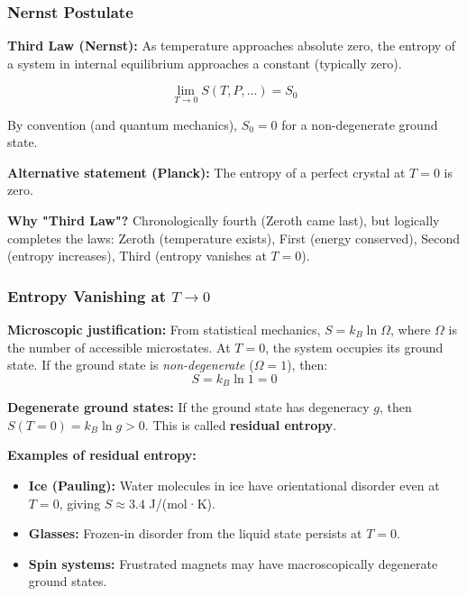 \documentclass[9pt,twocoloumn]{article}
\begin{document}
\subsubsection{Nernst Postulate}

\textbf{Third Law (Nernst):} As temperature approaches absolute zero, the entropy of a system in internal equilibrium approaches a constant (typically zero).

\begin{equation}
\boxed{\lim_{T \to 0} S(T, P, \ldots) = S_0}
\end{equation}

By convention (and quantum mechanics), $S_0 = 0$ for a non-degenerate ground state.

\textbf{Alternative statement (Planck):} The entropy of a perfect crystal at $T = 0$ is zero.

\textbf{Why "Third Law"?} Chronologically fourth (Zeroth came last), but logically completes the laws: Zeroth (temperature exists), First (energy conserved), Second (entropy increases), Third (entropy vanishes at $T = 0$).

\subsubsection{Entropy Vanishing at $T \to 0$}

\textbf{Microscopic justification:} From statistical mechanics, $S = k_B \ln \Omega$, where $\Omega$ is the number of accessible microstates. At $T = 0$, the system occupies its ground state. If the ground state is \emph{non-degenerate} ($\Omega = 1$), then:
\begin{equation}
S = k_B \ln 1 = 0
\end{equation}

\textbf{Degenerate ground states:} If the ground state has degeneracy $g$, then $S(T=0) = k_B \ln g > 0$. This is called \textbf{residual entropy}.

\textbf{Examples of residual entropy:}
\begin{itemize}
    \item \textbf{Ice (Pauling):} Water molecules in ice have orientational disorder even at $T = 0$, giving $S \approx 3.4$ J/(mol·K).
    \item \textbf{Glasses:} Frozen-in disorder from the liquid state persists at $T = 0$.
    \item \textbf{Spin systems:} Frustrated magnets may have macroscopically degenerate ground states.
\end{itemize}
\end{document}
